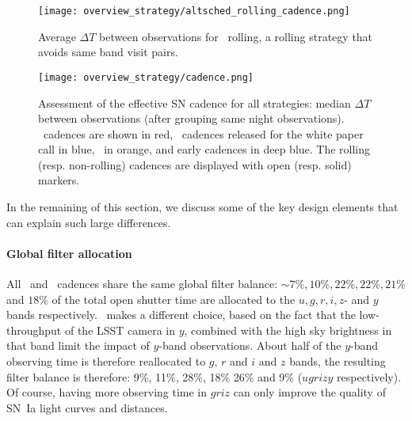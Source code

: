 \begin{figure}
  \begin{center}
    \texttt{[image: overview\_strategy/altsched\_rolling\_cadence.png]}
    \caption{Average $\Delta T$ between observations for \altsched~rolling, a rolling strategy that avoids same band
      visit pairs.}
    \label{fig:altsched_rolling_effective_cadences}
  \end{center}
\end{figure}

\begin{figure}
  \begin{center}
    \texttt{[image: overview\_strategy/cadence.png]}
    \caption{Assessment of the effective SN cadence for all
      strategies: median $\Delta T$ between observations (after
      grouping same night observations). \altsched~cadences are shown
      in red, \opsim~cadences released for the white paper call in
      blue, \slair~in orange, and early cadences in deep blue. The
      rolling (resp. non-rolling) cadences are displayed with open
      (resp. solid) markers. }
    \label{fig:effective_cadence}
  \end{center}
\end{figure}

In the remaining of this section, we discuss some of the key design
elements that can explain such large differences.


\paragraph{Global filter allocation} All \opsim~and \slair~cadences   share the same global filter balance: 
$\sim 7\%, 10\%, 22\%, 22\%, 21\%$ and $18\%$ of the total open shutter time
are allocated to the $u, g, r, i, z$- and $y$ bands respectively.
\altschedsched~makes a different choice, based on the fact that the
low-throughput of the LSST camera in $y$, combined with the high sky
brightness in that band limit the impact of $y$-band observations.
About half of the $y$-band observing time is therefore reallocated to
$g$, $r$ and $i$ and $z$ bands, the resulting filter balance is
therefore: 9\%, 11\%, 28\%, 18\% 26\% and 9\% ($ugrizy$ respectively). Of course, having more
observing time in $griz$ can only improve the quality of SN~Ia light curves and distances.


